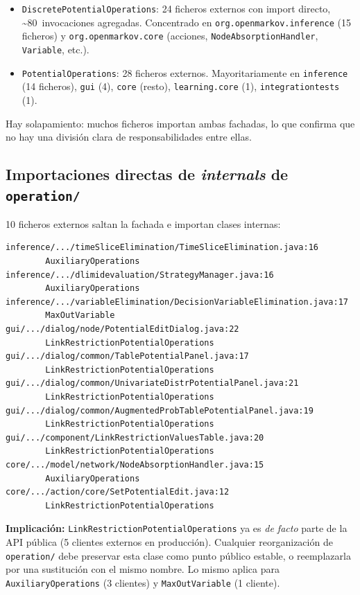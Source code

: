 \documentclass[11pt,a4paper]{article}
\newcommand{\code}[1]{\texttt{#1}}
\newcommand{\warn}[1]{\textcolor{warnorange}{\textbf{#1}}}
\begin{document}
\begin{itemize}[leftmargin=*]
  \item \code{DiscretePotentialOperations}: 24 ficheros externos con import
        directo, \textasciitilde 80~invocaciones agregadas. Concentrado en
        \code{org.openmarkov.inference} (15 ficheros) y
        \code{org.openmarkov.core} (acciones, \code{NodeAbsorptionHandler},
        \code{Variable}, etc.).
  \item \code{PotentialOperations}: 28 ficheros externos. Mayoritariamente en
        \code{inference} (14 ficheros), \code{gui} (4),
        \code{core} (resto), \code{learning.core} (1),
        \code{integrationtests} (1).
\end{itemize}

Hay solapamiento: muchos ficheros importan ambas fachadas, lo que confirma que
no hay una división clara de responsabilidades entre ellas.

\subsection{Importaciones directas de \emph{internals} de \code{operation/}}

10 ficheros externos saltan la fachada e importan clases internas:

\begin{lstlisting}[caption={Imports directos a clases internas del subpaquete operation.}]
inference/.../timeSliceElimination/TimeSliceElimination.java:16
        AuxiliaryOperations
inference/.../dlimidevaluation/StrategyManager.java:16
        AuxiliaryOperations
inference/.../variableElimination/DecisionVariableElimination.java:17
        MaxOutVariable
gui/.../dialog/node/PotentialEditDialog.java:22
        LinkRestrictionPotentialOperations
gui/.../dialog/common/TablePotentialPanel.java:17
        LinkRestrictionPotentialOperations
gui/.../dialog/common/UnivariateDistrPotentialPanel.java:21
        LinkRestrictionPotentialOperations
gui/.../dialog/common/AugmentedProbTablePotentialPanel.java:19
        LinkRestrictionPotentialOperations
gui/.../component/LinkRestrictionValuesTable.java:20
        LinkRestrictionPotentialOperations
core/.../model/network/NodeAbsorptionHandler.java:15
        AuxiliaryOperations
core/.../action/core/SetPotentialEdit.java:12
        LinkRestrictionPotentialOperations
\end{lstlisting}

\warn{Implicación:} \code{LinkRestrictionPotentialOperations} ya es
\emph{de facto} parte de la API pública (5 clientes externos en producción).
Cualquier reorganización de \code{operation/} debe preservar esta clase como
punto público estable, o reemplazarla por una sustitución con el mismo nombre.
Lo mismo aplica para \code{AuxiliaryOperations} (3 clientes) y
\code{MaxOutVariable} (1 cliente).
\end{document}
